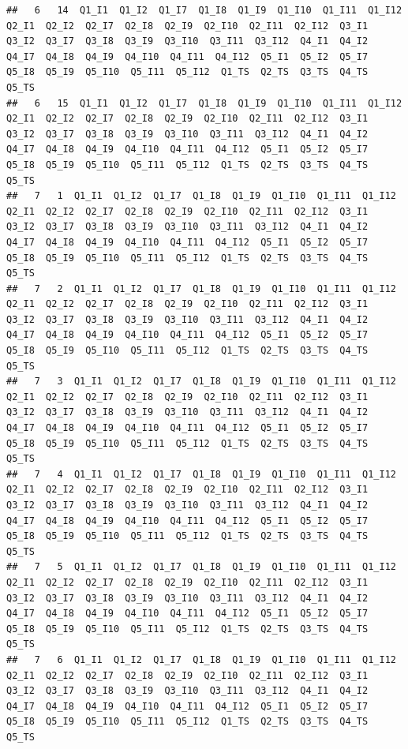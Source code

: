 \documentclass[]{book}
\begin{document}
\begin{verbatim}
##   6   14  Q1_I1  Q1_I2  Q1_I7  Q1_I8  Q1_I9  Q1_I10  Q1_I11  Q1_I12  Q2_I1  Q2_I2  Q2_I7  Q2_I8  Q2_I9  Q2_I10  Q2_I11  Q2_I12  Q3_I1  Q3_I2  Q3_I7  Q3_I8  Q3_I9  Q3_I10  Q3_I11  Q3_I12  Q4_I1  Q4_I2  Q4_I7  Q4_I8  Q4_I9  Q4_I10  Q4_I11  Q4_I12  Q5_I1  Q5_I2  Q5_I7  Q5_I8  Q5_I9  Q5_I10  Q5_I11  Q5_I12  Q1_TS  Q2_TS  Q3_TS  Q4_TS  Q5_TS
##   6   15  Q1_I1  Q1_I2  Q1_I7  Q1_I8  Q1_I9  Q1_I10  Q1_I11  Q1_I12  Q2_I1  Q2_I2  Q2_I7  Q2_I8  Q2_I9  Q2_I10  Q2_I11  Q2_I12  Q3_I1  Q3_I2  Q3_I7  Q3_I8  Q3_I9  Q3_I10  Q3_I11  Q3_I12  Q4_I1  Q4_I2  Q4_I7  Q4_I8  Q4_I9  Q4_I10  Q4_I11  Q4_I12  Q5_I1  Q5_I2  Q5_I7  Q5_I8  Q5_I9  Q5_I10  Q5_I11  Q5_I12  Q1_TS  Q2_TS  Q3_TS  Q4_TS  Q5_TS
##   7   1  Q1_I1  Q1_I2  Q1_I7  Q1_I8  Q1_I9  Q1_I10  Q1_I11  Q1_I12  Q2_I1  Q2_I2  Q2_I7  Q2_I8  Q2_I9  Q2_I10  Q2_I11  Q2_I12  Q3_I1  Q3_I2  Q3_I7  Q3_I8  Q3_I9  Q3_I10  Q3_I11  Q3_I12  Q4_I1  Q4_I2  Q4_I7  Q4_I8  Q4_I9  Q4_I10  Q4_I11  Q4_I12  Q5_I1  Q5_I2  Q5_I7  Q5_I8  Q5_I9  Q5_I10  Q5_I11  Q5_I12  Q1_TS  Q2_TS  Q3_TS  Q4_TS  Q5_TS
##   7   2  Q1_I1  Q1_I2  Q1_I7  Q1_I8  Q1_I9  Q1_I10  Q1_I11  Q1_I12  Q2_I1  Q2_I2  Q2_I7  Q2_I8  Q2_I9  Q2_I10  Q2_I11  Q2_I12  Q3_I1  Q3_I2  Q3_I7  Q3_I8  Q3_I9  Q3_I10  Q3_I11  Q3_I12  Q4_I1  Q4_I2  Q4_I7  Q4_I8  Q4_I9  Q4_I10  Q4_I11  Q4_I12  Q5_I1  Q5_I2  Q5_I7  Q5_I8  Q5_I9  Q5_I10  Q5_I11  Q5_I12  Q1_TS  Q2_TS  Q3_TS  Q4_TS  Q5_TS
##   7   3  Q1_I1  Q1_I2  Q1_I7  Q1_I8  Q1_I9  Q1_I10  Q1_I11  Q1_I12  Q2_I1  Q2_I2  Q2_I7  Q2_I8  Q2_I9  Q2_I10  Q2_I11  Q2_I12  Q3_I1  Q3_I2  Q3_I7  Q3_I8  Q3_I9  Q3_I10  Q3_I11  Q3_I12  Q4_I1  Q4_I2  Q4_I7  Q4_I8  Q4_I9  Q4_I10  Q4_I11  Q4_I12  Q5_I1  Q5_I2  Q5_I7  Q5_I8  Q5_I9  Q5_I10  Q5_I11  Q5_I12  Q1_TS  Q2_TS  Q3_TS  Q4_TS  Q5_TS
##   7   4  Q1_I1  Q1_I2  Q1_I7  Q1_I8  Q1_I9  Q1_I10  Q1_I11  Q1_I12  Q2_I1  Q2_I2  Q2_I7  Q2_I8  Q2_I9  Q2_I10  Q2_I11  Q2_I12  Q3_I1  Q3_I2  Q3_I7  Q3_I8  Q3_I9  Q3_I10  Q3_I11  Q3_I12  Q4_I1  Q4_I2  Q4_I7  Q4_I8  Q4_I9  Q4_I10  Q4_I11  Q4_I12  Q5_I1  Q5_I2  Q5_I7  Q5_I8  Q5_I9  Q5_I10  Q5_I11  Q5_I12  Q1_TS  Q2_TS  Q3_TS  Q4_TS  Q5_TS
##   7   5  Q1_I1  Q1_I2  Q1_I7  Q1_I8  Q1_I9  Q1_I10  Q1_I11  Q1_I12  Q2_I1  Q2_I2  Q2_I7  Q2_I8  Q2_I9  Q2_I10  Q2_I11  Q2_I12  Q3_I1  Q3_I2  Q3_I7  Q3_I8  Q3_I9  Q3_I10  Q3_I11  Q3_I12  Q4_I1  Q4_I2  Q4_I7  Q4_I8  Q4_I9  Q4_I10  Q4_I11  Q4_I12  Q5_I1  Q5_I2  Q5_I7  Q5_I8  Q5_I9  Q5_I10  Q5_I11  Q5_I12  Q1_TS  Q2_TS  Q3_TS  Q4_TS  Q5_TS
##   7   6  Q1_I1  Q1_I2  Q1_I7  Q1_I8  Q1_I9  Q1_I10  Q1_I11  Q1_I12  Q2_I1  Q2_I2  Q2_I7  Q2_I8  Q2_I9  Q2_I10  Q2_I11  Q2_I12  Q3_I1  Q3_I2  Q3_I7  Q3_I8  Q3_I9  Q3_I10  Q3_I11  Q3_I12  Q4_I1  Q4_I2  Q4_I7  Q4_I8  Q4_I9  Q4_I10  Q4_I11  Q4_I12  Q5_I1  Q5_I2  Q5_I7  Q5_I8  Q5_I9  Q5_I10  Q5_I11  Q5_I12  Q1_TS  Q2_TS  Q3_TS  Q4_TS  Q5_TS

\end{verbatim}
\end{document}
